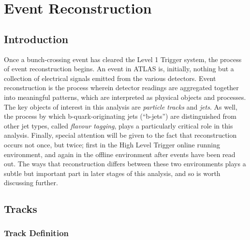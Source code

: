 \chapter{Event Reconstruction}

    \section{Introduction}
        Once a bunch-crossing event has cleared the Level 1 Trigger system, the process of event reconstruction begins.
        An event in ATLAS is, initially, nothing but a collection of electrical signals emitted from the various detectors.
        Event reconstruction is the process wherein detector readings are aggregated together into meaningful patterns,
            which are interpreted as physical objects and processes.
        The key objects of interest in this analysis are \textit{particle tracks} and \textit{jets}.
        As well, the process by which b-quark-originating jets (``b-jets'') are distinguished from other jet types,
            called \textit{flavour tagging}, plays a particularly critical role in this analysis.
        Finally, special attention will be given to the fact that reconstruction occurs not once, but twice;
            first in the High Level Trigger online running environment,
            and again in the offline environment after events have been read out.
        The ways that reconstruction differs between these two environments plays a subtle but important part
            in later stages of this analysis, and so is worth discussing further.


    \section{Tracks}
            
        \subsection{Track Definition}
            
